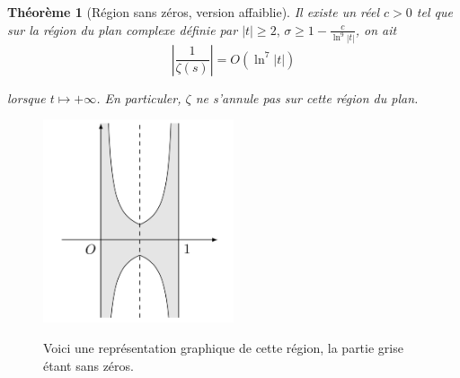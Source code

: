 \documentclass[french]{report}
\newtheorem{theorem}{Théorème}[section]
\begin{document}
\begin{theorem}[Région sans zéros, version affaiblie]\label{eq:region-faible-sans-zero}
  Il existe un réel $c>0$ tel que sur la région du plan complexe définie par $|t|\geq2,\,\sigma\geq1-\frac{c}{\ln^9|t|}$, on ait
  \[ \left|\frac{1}{\zeta(s)}\right| = O(\ln^7|t|) \]

  lorsque $t\mapsto+\infty$. En particuler, $\zeta$ ne s'annule pas sur cette région du plan.
\end{theorem}

\begin{figure}[h]
  \centering
  \caption{Voici une représentation graphique de cette région, la partie grise étant sans zéros.}
  \includegraphics[width=0.5\textwidth]{fig_region_sans_zeros.png}
  \label{fig:region-sans-zero}
\end{figure}
    
\end{document}
